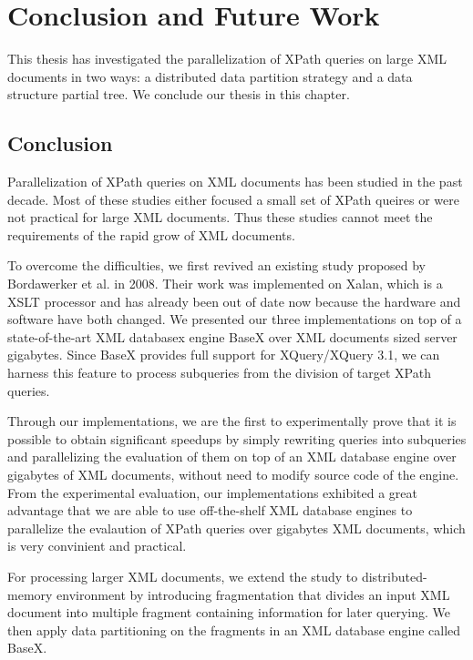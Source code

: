 \chapter{Conclusion and Future Work}

This thesis has investigated the parallelization of XPath queries on large XML
documents in two ways: a distributed data partition strategy and a data 
structure partial tree. We conclude our thesis in this chapter.

\section{Conclusion}

Parallelization of XPath queries on XML documents has been studied in the past
decade. Most of these studies either focused a small set of XPath queires or
were not practical for large XML documents. Thus these studies cannot meet the
requirements of the rapid grow of XML documents.

To overcome the difficulties, we first revived an existing study proposed by
Bordawerker et al. in 2008. Their work was implemented on Xalan, which is a XSLT
processor and has already been out of date now because the hardware and software
have both changed. We presented our three implementations on top of a
state-of-the-art XML databasex engine BaseX over XML documents sized server
gigabytes. Since BaseX provides full support for XQuery/XQuery 3.1, we can
harness this feature to process subqueries from the division of target XPath
queries. 

Through our implementations, we are the first to experimentally prove that it is
possible to obtain significant speedups by simply rewriting queries into
subqueries and parallelizing the evaluation of them on top of an XML database
engine over gigabytes of XML documents, without need to modify source code of
the engine. From the experimental evaluation, our implementations exhibited a
great advantage that we are able to use off-the-shelf XML database engines to
parallelize the evalaution of XPath queries over gigabytes XML documents, which
is very convinient and practical.

For processing larger XML documents, we extend the study to distributed-memory
environment by introducing fragmentation that divides an input XML document 
into multiple fragment containing information for later querying. We then apply
data partitioning on the fragments in an XML database engine called BaseX. 

